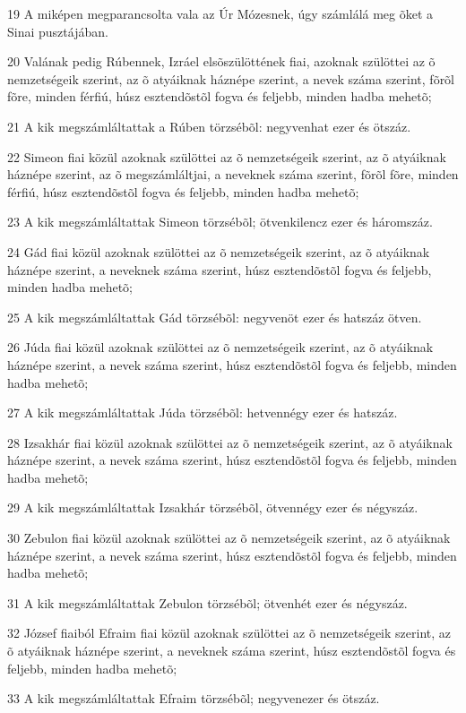 \par 19 A miképen megparancsolta vala az Úr Mózesnek, úgy számlálá meg õket a Sinai pusztájában.
\par 20 Valának pedig Rúbennek, Izráel elsõszülöttének fiai, azoknak szülöttei az õ nemzetségeik szerint, az õ atyáiknak háznépe szerint, a nevek száma szerint, fõrõl fõre, minden férfiú, húsz esztendõstõl fogva és feljebb, minden hadba mehetõ;
\par 21 A kik megszámláltattak a Rúben törzsébõl: negyvenhat ezer és ötszáz.
\par 22 Simeon fiai közül azoknak szülöttei az õ nemzetségeik szerint, az õ atyáiknak háznépe szerint, az õ megszámláltjai, a neveknek száma szerint, fõrõl fõre, minden férfiú, húsz esztendõstõl fogva és feljebb, minden hadba mehetõ;
\par 23 A kik megszámláltattak Simeon törzsébõl; ötvenkilencz ezer és háromszáz.
\par 24 Gád fiai közül azoknak szülöttei az õ nemzetségeik szerint, az õ atyáiknak háznépe szerint, a neveknek száma szerint, húsz esztendõstõl fogva és feljebb, minden hadba mehetõ;
\par 25 A kik megszámláltattak Gád törzsébõl: negyvenöt ezer és hatszáz ötven.
\par 26 Júda fiai közül azoknak szülöttei az õ nemzetségeik szerint, az õ atyáiknak háznépe szerint, a nevek száma szerint, húsz esztendõstõl fogva és feljebb, minden hadba mehetõ;
\par 27 A kik megszámláltattak Júda törzsébõl: hetvennégy ezer és hatszáz.
\par 28 Izsakhár fiai közül azoknak szülöttei az õ nemzetségeik szerint, az õ atyáiknak háznépe szerint, a nevek száma szerint, húsz esztendõstõl fogva és feljebb, minden hadba mehetõ;
\par 29 A kik megszámláltattak Izsakhár törzsébõl, ötvennégy ezer és négyszáz.
\par 30 Zebulon fiai közül azoknak szülöttei az õ nemzetségeik szerint, az õ atyáiknak háznépe szerint, a nevek száma szerint, húsz esztendõstõl fogva és feljebb, minden hadba mehetõ;
\par 31 A kik megszámláltattak Zebulon törzsébõl; ötvenhét ezer és négyszáz.
\par 32 József fiaiból Efraim fiai közül azoknak szülöttei az õ nemzetségeik szerint, az õ atyáiknak háznépe szerint, a neveknek száma szerint, húsz esztendõstõl fogva és feljebb, minden hadba mehetõ;
\par 33 A kik megszámláltattak Efraim törzsébõl; negyvenezer és ötszáz.
